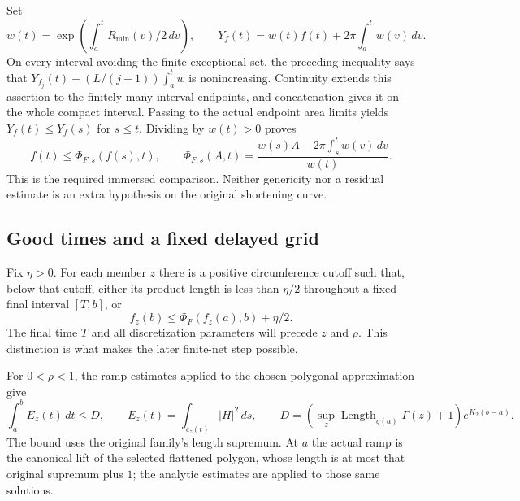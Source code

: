 Set
\[
 w(t)=\exp\!\left(\int_a^t R_{\min}(v)/2\,dv\right),\qquad
 Y_f(t)=w(t)f(t)+2\pi\int_a^t w(v)\,dv.
\]
On every interval avoiding the finite exceptional set, the preceding
inequality says that
$Y_{f_j}(t)-(L/(j+1))\int_a^t w$ is nonincreasing.  Continuity extends
this assertion to the finitely many interval endpoints, and concatenation
gives it on the whole compact interval.  Passing to the actual endpoint
area limits yields $Y_f(t)\le Y_f(s)$ for $s\le t$.
Dividing by $w(t)>0$ proves
\[
 f(t)\le\Phi_{F,s}(f(s),t),\qquad
 \Phi_{F,s}(A,t)=\frac{w(s)A-2\pi\int_s^t w(v)\,dv}{w(t)}.
\]
This is the required immersed comparison.  Neither genericity nor a
residual estimate is an extra hypothesis on the original shortening curve.

\subsection{Good times and a fixed delayed grid}
\label{sec:good-time-grid}

\begin{lemma}
\label{lem:annular-member-terminal}
Fix $\eta>0$. For each member $z$ there is a positive circumference
cutoff such that, below that cutoff, either its product length
is less than $\eta/2$ throughout a fixed final interval $[T,b]$, or
\[
 f_z(b)\le\Phi_F(f_z(a),b)+\eta/2.
\]
The final time $T$ and all discretization parameters will precede $z$
and $\rho$.  This distinction is what makes the later finite-net step
possible.
\end{lemma}

For $0<\rho<1$, the ramp estimates applied to the chosen polygonal
approximation give
\[
 \int_a^b E_z(t)\,dt\le D,\qquad
 E_z(t)=\int_{c_z(t)}|H|^2\,ds,\qquad
 D=(\sup_z\operatorname{Length}_{g(a)}\Gamma(z)+1)e^{K_2(b-a)}.
\]
The bound uses the original family's length supremum.  At $a$ the actual
ramp is the canonical lift of the selected flattened polygon, whose length
is at most that original supremum plus $1$; the analytic estimates are
applied to those same solutions.

